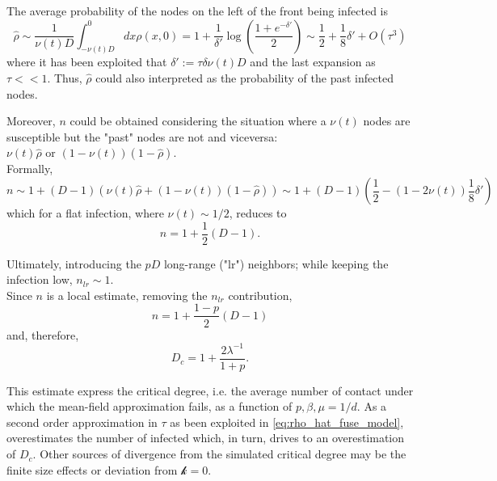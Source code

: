\documentclass[a4paper,10pt,twoside]{book} %
\theoremstyle{definition}
\begin{document}
The average probability of the nodes on the left of the front being infected is
\begin{equation}
	\hat{\rho} \sim \frac{1}{\nu(t) D} \int_{-\nu(t) D}^{0} dx \rho(x,0) = 1+ \frac{1}{\delta'} \log( \frac{1+e^{-\delta'}}{2} )
	\sim \frac{1}{2} + \frac{1}{8} \delta' + O(\tau^3) 
	\label{eq:rho_hat_fuse_model}
\end{equation}
where it has been exploited that $\delta':=\tau \delta \nu(t) D$ and the last expansion as $\tau<<1$. Thus, $\hat{\rho}$ could also interpreted as the probability of the past infected nodes.

Moreover, $n$ could be obtained considering the situation where a $\nu(t)$ nodes are susceptible but the "past" nodes are not and viceversa: $\nu(t) \hat{\rho} \text{ or } (1-\nu(t))(1- \hat{\rho})$. 
\\Formally,
\begin{equation}
	n \sim 1+ (D-1)(\nu(t)\hat{\rho}+(1-\nu(t))(1-\hat{\rho}))
	\sim 1+ (D-1)(\frac{1}{2} - (1-2\nu(t)) \frac{1}{8} \delta')
\end{equation}
which for a flat infection, where $\nu(t)\sim 1/2$, reduces to
\begin{equation}
	n = 1 + \frac{1}{2}(D-1).
\end{equation} 

Ultimately, introducing the $pD$ long-range ("lr") neighbors; while keeping the infection low, $n_{lr} \sim 1$.
\\Since $n$ is a local estimate, removing the $n_{lr}$ contribution,
\begin{equation}
	n = 1 + \frac{1-p}{2}(D-1)
\end{equation}   
and, therefore,
\begin{equation}
	D_c = 1+ \frac{2 \lambda^{-1}}{1+p}.
	\label{eq:final_D_c_fuse_network}
\end{equation}

This estimate express the critical degree, i.e. the average number of contact under which the mean-field approximation fails, as a function of $p,\beta,\mu = 1/d$. As a second order approximation in $\tau$ as been exploited in \autoref{eq:rho_hat_fuse_model}, overestimates the number of infected which, in turn, drives to an overestimation of $D_c$. Other sources of divergence from the simulated critical degree may be the finite size effects or deviation from $\mathcal{k} = 0$.
\end{document}
